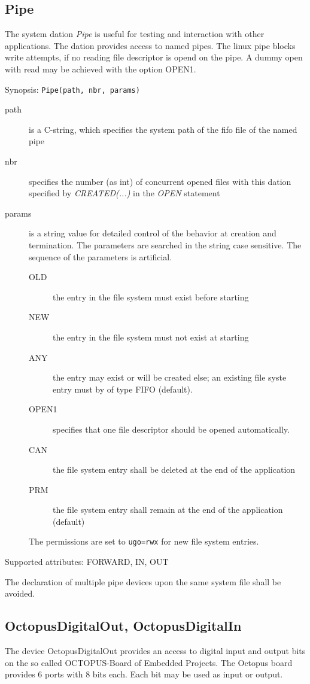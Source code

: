 \subsection{Pipe}
The system dation {\em Pipe} is useful for testing and interaction with
other applications. The dation provides access to named pipes.
The linux pipe blocks write attempts, if no reading file descriptor
is opend on the pipe. 
A dummy open with read may be achieved with the option OPEN1.

Synopsis: \verb|Pipe(path, nbr, params)|

\begin{description}
\item [path] is a C-string, which specifies the system path of the fifo file
    of the named pipe
\item[nbr] specifies the number (as int) of concurrent opened files with this dation
     specified by {\em CREATED(...)} in the {\em OPEN} statement
\item [params] is a string value for detailed control of the behavior
     at creation and termination. The parameters are searched in the string
     case sensitive. The sequence of the parameters is artificial.
   \begin{description}
     \item[OLD] the entry in the file system must exist before starting
     \item[NEW] the entry in the file system must not exist at starting
     \item[ANY] the entry may exist or will be created else; an existing
                file syste entry must by of type FIFO (default).
     \item[OPEN1] specifies that one file descriptor should be opened 
                automatically.
     \item[CAN] the file system entry shall be deleted at the end of the 
                application
     \item[PRM] the file system entry shall remain at the end of the
                application (default)
   \end{description} 
   The permissions are set to \verb|ugo=rwx| for new file system entries.
\end{description}

Supported attributes: FORWARD, IN, OUT

The declaration of multiple pipe devices upon the same system file shall
be avoided.
 
\subsection{OctopusDigitalOut, OctopusDigitalIn}
The device OctopusDigitalOut provides an access to digital input and 
output bits
on the so called OCTOPUS-Board of Embedded Projects.
The Octopus board provides 6 ports with 8 bits each. Each bit may be
used as input or output.

